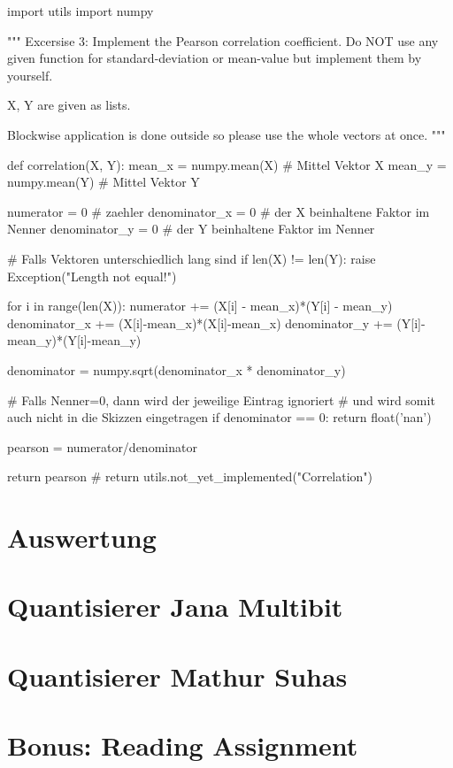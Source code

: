 \documentclass[12pt,a4paper]{article}
\begin{document}
\begin{python}

import utils
import numpy

"""
Excersise 3:
Implement the Pearson correlation coefficient.
Do NOT use any given function for standard-deviation 
or mean-value but implement them by yourself.

X, Y are given as lists.

Blockwise application is done outside so please use the 
whole vectors at once.
"""


def correlation(X, Y):
    mean_x = numpy.mean(X) # Mittel Vektor X
    mean_y = numpy.mean(Y) # Mittel Vektor Y

    numerator = 0 # zaehler
    denominator_x = 0 # der X beinhaltene Faktor im Nenner
    denominator_y = 0 # der Y beinhaltene Faktor im Nenner

    # Falls Vektoren unterschiedlich lang sind
    if len(X) != len(Y):
        raise Exception("Length not equal!\n")

    for i in range(len(X)):
        numerator += (X[i] - mean_x)*(Y[i] - mean_y)
        denominator_x += (X[i]-mean_x)*(X[i]-mean_x)
        denominator_y += (Y[i]-mean_y)*(Y[i]-mean_y)

    denominator = numpy.sqrt(denominator_x * denominator_y)

    # Falls Nenner=0, dann wird der jeweilige Eintrag ignoriert
    # und wird somit auch nicht in die Skizzen eingetragen
    if denominator == 0:
        return float('nan')

    pearson = numerator/denominator

    return pearson
    # return utils.not_yet_implemented("Correlation")

\end{python}

\section{Auswertung}

\section{Quantisierer Jana Multibit}

\section{Quantisierer Mathur Suhas}

\section{Bonus: Reading Assignment}
\end{document}
